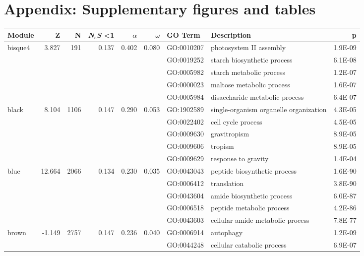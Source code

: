 \section{Appendix: Supplementary figures and tables}

\begin{landscape}

\begin{table}[ht]
\centering
\begin{tabular}{|l|rrrrrlP{5cm}r|}
  \hline
Module & Z & N & \textit{N$_{e}$S} \textless 1 & $\alpha$ & $\omega$ & GO Term & Description & p \\ 
  \hline
bisque4 & 3.827 & 191 & 0.137 & 0.402 & 0.080 & GO:0010207 & photosystem II assembly & 1.9E-09 \\ 
   &  &  &  &  &  & GO:0019252 & starch biosynthetic process & 6.1E-08 \\ 
   &  &  &  &  &  & GO:0005982 & starch metabolic process & 1.2E-07 \\ 
   &  &  &  &  &  & GO:0000023 & maltose metabolic process & 1.6E-07 \\ 
   &  &  &  &  &  & GO:0005984 & disaccharide metabolic process & 6.4E-07 \\ 
\hline
  black & 8.104 & 1106 & 0.147 & 0.290 & 0.053 & GO:1902589 & single-organism organelle organization & 4.3E-05 \\ 
   &  &  &  &  &  & GO:0022402 & cell cycle process & 4.5E-05 \\ 
   &  &  &  &  &  & GO:0009630 & gravitropism & 8.9E-05 \\ 
   &  &  &  &  &  & GO:0009606 & tropism & 8.9E-05 \\ 
   &  &  &  &  &  & GO:0009629 & response to gravity & 1.4E-04 \\ 
\hline  
blue & 12.664 & 2066 & 0.134 & 0.230 & 0.035 & GO:0043043 & peptide biosynthetic process & 1.6E-90 \\ 
   &  &  &  &  &  & GO:0006412 & translation & 3.8E-90 \\ 
   &  &  &  &  &  & GO:0043604 & amide biosynthetic process & 6.0E-87 \\ 
   &  &  &  &  &  & GO:0006518 & peptide metabolic process & 4.2E-86 \\ 
   &  &  &  &  &  & GO:0043603 & cellular amide metabolic process & 7.8E-77 \\ 
\hline  
brown & -1.149 & 2757 & 0.147 & 0.236 & 0.040 & GO:0006914 & autophagy & 1.2E-09 \\ 
   &  &  &  &  &  & GO:0044248 & cellular catabolic process & 6.9E-07 \\ 

\end{tabular}
\end{table}
\end{landscape}
